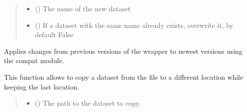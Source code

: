 \documentclass[letterpaper,10pt,english]{sphinxmanual}
\begin{document}
\begin{fulllineitems}
\begin{fulllineitems}
\begin{quote}
\begin{description}
\begin{itemize}
\item {} 
\sphinxAtStartPar
{} () \textendash{} The name of the new dataset

\item {} 
\sphinxAtStartPar
{} (\sphinxstyleliteralemphasis{\sphinxupquote{, }}) \textendash{} If a dataset with the same name already exists, overwrite it, by default False

\end{itemize}

\end{description}\end{quote}

\end{fulllineitems}


\begin{fulllineitems}
\label{\detokenize{_autosummary/HDF5_BLS.wrapper:HDF5_BLS.wrapper.Wrapper.compatibility_changes}}
\pysigstartsignatures
\pysiglinewithargsret
{}
{}
{}
\pysigstopsignatures
\sphinxAtStartPar
Applies changes from previous versions of the wrapper to newest versions using the compat module.

\end{fulllineitems}


\begin{fulllineitems}
\label{\detokenize{_autosummary/HDF5_BLS.wrapper:HDF5_BLS.wrapper.Wrapper.copy_dataset}}
\pysigstartsignatures
\pysiglinewithargsret
{}
{\sphinxparamcomma {}}
{}
\pysigstopsignatures
\sphinxAtStartPar
This function allows to copy a dataset from the file to a different location while keeping the last location.
\begin{quote}\begin{description}
\begin{itemize}
\item {} 
\sphinxAtStartPar
{} () \textendash{} The path to the dataset to copy.


\end{itemize}
\end{description}
\end{quote}
\end{fulllineitems}
\end{fulllineitems}
\end{document}
